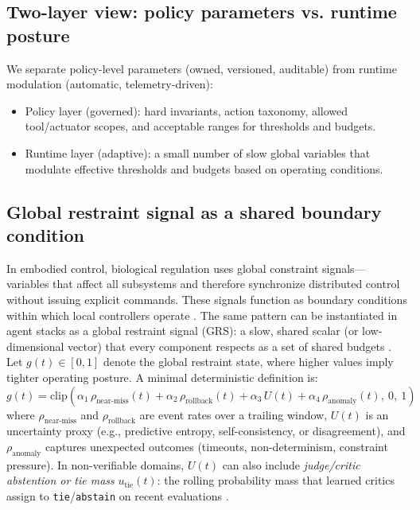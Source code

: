 \documentclass[11pt]{article}
\begin{document}
\subsection{Two-layer view: policy parameters vs. runtime posture}
We separate policy-level parameters (owned, versioned, auditable) from runtime modulation (automatic, telemetry-driven):
\begin{itemize}
\item 
Policy layer (governed): hard invariants, action taxonomy, allowed tool/actuator scopes, and
acceptable ranges for thresholds and budgets.
\item 
Runtime layer (adaptive): a small number of slow global variables that modulate effective
thresholds and budgets based on operating conditions.
\end{itemize}
\subsection{Global restraint signal as a shared boundary condition}
In embodied control, biological regulation uses global constraint signals—variables that affect all
subsystems and therefore synchronize distributed control without issuing explicit commands. These
signals function as boundary conditions within which local controllers operate \citep{jeffreys2025baseline_constraint}. The same pattern
can be instantiated in agent stacks as a global restraint signal (GRS): a slow, shared scalar (or
low-dimensional vector) that every component respects as a set of shared budgets \citep{jeffreys2025patterns_agent_llm}.
Let $g(t)\in[0,1]$ denote the global restraint state, where higher values imply tighter operating posture. A minimal deterministic definition is:
\begin{equation}
g(t)=\mathrm{clip}\left(\alpha_1\,\rho_{\text{near-miss}}(t)+\alpha_2\,\rho_{\text{rollback}}(t)+\alpha_3\,U(t)+\alpha_4\,\rho_{\text{anomaly}}(t),\ 0,\ 1\right)
\end{equation}
where $\rho_{\text{near-miss}}$ and $\rho_{\text{rollback}}$ are event rates over a trailing window, $U(t)$ is an uncertainty proxy (e.g., predictive entropy, self-consistency, or disagreement), and $\rho_{\text{anomaly}}$ captures unexpected outcomes (timeouts, non-determinism, constraint pressure). In non-verifiable domains, $U(t)$ can also include \emph{judge/critic abstention or tie mass} $u_{\text{tie}}(t)$: the rolling probability mass that learned critics assign to \texttt{tie}/\texttt{abstain} on recent evaluations \citep{cai2025escapingverifier}.
\end{document}
